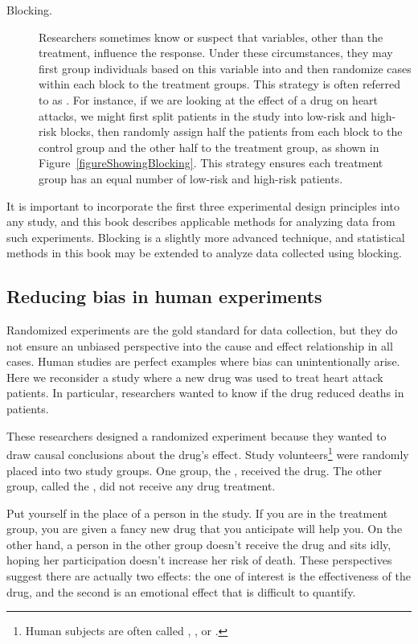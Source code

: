\begin{description}
\item[Blocking.] Researchers sometimes know or suspect that variables, other than the treatment, influence the response. Under these circumstances, they may first group individuals based on this variable into  and then randomize cases within each block to the treatment groups. This strategy is often referred to as . For instance, if we are looking at the effect of a drug on heart attacks, we might first split patients in the study into low-risk and high-risk blocks, then randomly assign half the patients from each block to the control group and the other half to the treatment group, as shown in Figure~\ref{figureShowingBlocking}. This strategy ensures each treatment group has an equal number of low-risk and high-risk patients.
\end{description}

It is important to incorporate the first three experimental
design principles into any study, and this book describes
applicable methods for analyzing data from such experiments.
Blocking is a slightly more advanced technique, and statistical
methods in this book may be extended to analyze data collected
using blocking.

\subsection{Reducing bias in human experiments}
\label{biasInHumanExperiments}

Randomized experiments are the gold standard for data collection,
but they do not ensure an unbiased perspective into the cause and
effect relationship in all cases.
Human studies are perfect examples where bias can unintentionally
arise.
Here we reconsider a study where a new drug was used to treat
heart attack patients.
In particular, researchers wanted to know if the drug reduced
deaths in patients.

These researchers designed a randomized experiment because they wanted to draw causal conclusions about the drug's effect. Study volunteers\footnote{Human subjects are often called , , or .} were randomly placed into two study groups. One group, the , received the drug. The other group, called the , did not receive any drug treatment.

Put yourself in the place of a person in the study. If you are in the treatment group, you are given a fancy new drug that you anticipate will help you. On the other hand, a person in the other group doesn't receive the drug and sits idly, hoping her participation doesn't increase her risk of death. These perspectives suggest there are actually two effects: the one of interest is the effectiveness of the drug, and the second is an emotional effect that is difficult to quantify.

